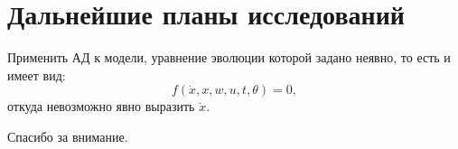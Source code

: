 \documentclass{beamer}
\begin{document}
\section{Дальнейшие планы исследований}

\begin{frame}{\secname}
	Применить АД к модели, уравнение эволюции которой задано неявно, то есть и
	имеет вид: 
	\[
		f(\dot{x},x,w,u,t,\theta)=0,
	\]
	откуда невозможно явно выразить $\dot{x}$.
\end{frame}

\begin{frame}
\begin{center}
  \LARGE{Спасибо за внимание.}
\end{center}
\end{frame}

\frame{\titlepage}
\end{document}
